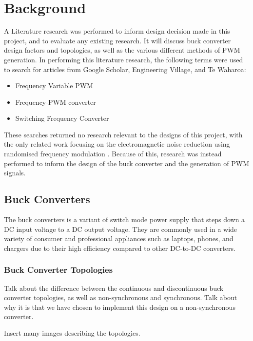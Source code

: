 \chapter{Background}\label{C:background}

A Literature research was performed to inform design decision made in this project, and to evaluate any existing research. It will discuss buck converter design factors and topologies, as well as the various different methods of PWM generation. In performing this literature research, the following terms were used to search for articles from Google Scholar, Engineering Village, and Te Waharoa:

\begin{itemize}
    \item Frequency Variable PWM
    \item Frequency-PWM converter
    \item Switching Frequency Converter
\end{itemize}

These searches returned no research relevant to the designs of this project, with the only related work focusing on the electromagnetic noise reduction using randomised frequency modulation \cite{Roman2001,Familiant2016}. Because of this, research was instead performed to inform the design of the buck converter and the generation of PWM signals.


\section{Buck Converters}


The buck converters is a variant of switch mode power supply that steps down a DC input voltage to a DC output voltage. They are commonly used in a wide variety of consumer and professional appliances such as laptops, phones, and chargers due to their high efficiency compared to other DC-to-DC converters.


\subsection{Buck Converter Topologies}

Talk about the difference between the continuous and discontinuous buck converter topologies, as well as non-synchronous and synchronous. Talk about why it is that we have chosen to implement this design on a non-synchronous converter.

Insert many images describing the topologies. 

